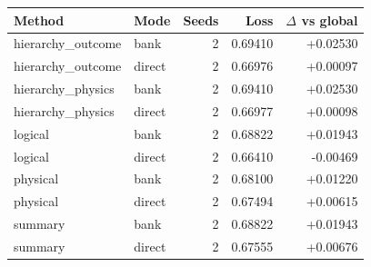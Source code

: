 \begin{tabular}{llrrr}
\hline
Method & Mode & Seeds & Loss & $\Delta$ vs global \\
\hline
hierarchy\_outcome & bank & 2 & 0.69410 & +0.02530 \\
hierarchy\_outcome & direct & 2 & 0.66976 & +0.00097 \\
hierarchy\_physics & bank & 2 & 0.69410 & +0.02530 \\
hierarchy\_physics & direct & 2 & 0.66977 & +0.00098 \\
logical & bank & 2 & 0.68822 & +0.01943 \\
logical & direct & 2 & 0.66410 & -0.00469 \\
physical & bank & 2 & 0.68100 & +0.01220 \\
physical & direct & 2 & 0.67494 & +0.00615 \\
summary & bank & 2 & 0.68822 & +0.01943 \\
summary & direct & 2 & 0.67555 & +0.00676 \\
\hline
\end{tabular}
